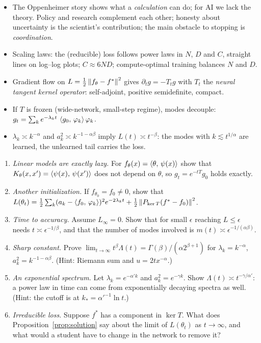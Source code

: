 \begin{takeaways}
\begin{itemize}
  \item The Oppenheimer story shows what a \emph{calculation} can do; for AI we lack the theory. Policy and research complement each other; honesty about uncertainty is the scientist's contribution; the main obstacle to stopping is \emph{coordination}.
  \item Scaling laws: the (reducible) loss follows power laws in $N$, $D$ and $C$, straight lines on log--log plots; $C\approx6ND$; compute-optimal training balances $N$ and $D$.
  \item Gradient flow on $L=\frac12\left\lVert f_\theta-f^*\right\rVert^2$ gives $\partial_tg=-T_tg$ with $T_t$ the \emph{neural tangent kernel operator}: self-adjoint, positive semidefinite, compact.
  \item If $T$ is frozen (wide-network, small-step regime), modes decouple: $g_t=\sum_ke^{-\lambda_kt}\,\left\langle g_0,\,\varphi_k\right\rangle\varphi_k$.
  \item $\lambda_k\asymp k^{-\alpha}$ and $a_k^2\asymp k^{-1-\alpha\beta}$ imply $L(t)\asymp t^{-\beta}$: the modes with $k\lesssim t^{1/\alpha}$ are learned, the unlearned tail carries the loss.
\end{itemize}
\end{takeaways}

\begin{exercise}
\begin{enumerate}
  \item \emph{Linear models are exactly lazy.} For $f_\theta(x)=\left\langle \theta,\,\psi(x)\right\rangle$ show that $K_\theta(x,x')=\left\langle \psi(x),\,\psi(x')\right\rangle$ does not depend on $\theta$, so $g_t=e^{-tT}g_0$ holds exactly.
  \item \emph{Another initialization.} If $f_{\theta_0}=f_0\ne0$, show that $L(\theta_t)=\tfrac12\sum_k(a_k-\left\langle f_0,\,\varphi_k\right\rangle)^2e^{-2\lambda_kt}+\tfrac12\left\lVert P_{\ker T}(f^*-f_0)\right\rVert^2$.
  \item \emph{Time to accuracy.} Assume $L_\infty=0$. Show that for small $\epsilon$ reaching $L\le\epsilon$ needs $t\asymp\epsilon^{-1/\beta}$, and that the number of modes involved is $m(t)\asymp\epsilon^{-1/(\alpha\beta)}$.
  \item \emph{Sharp constant.} Prove $\lim_{t\to\infty}t^\beta\Lambda(t)=\Gamma(\beta)/(\alpha2^{\beta+1})$ for $\lambda_k=k^{-\alpha}$, $a_k^2=k^{-1-\alpha\beta}$. (Hint: Riemann sum and $u=2tx^{-\alpha}$.)
  \item \emph{An exponential spectrum.} Let $\lambda_k=e^{-\alpha' k}$ and $a_k^2=e^{-\gamma k}$. Show $\Lambda(t)\asymp t^{-\gamma/\alpha'}$: a power law in time can come from exponentially decaying spectra as well. (Hint: the cutoff is at $k_*=\alpha'^{-1}\ln t$.)
  \item \emph{Irreducible loss.} Suppose $f^*$ has a component in $\ker T$. What does Proposition~\ref{prop:solution} say about the limit of $L(\theta_t)$ as $t\to\infty$, and what would a student have to change in the network to remove it?
\end{enumerate}
\end{exercise}
